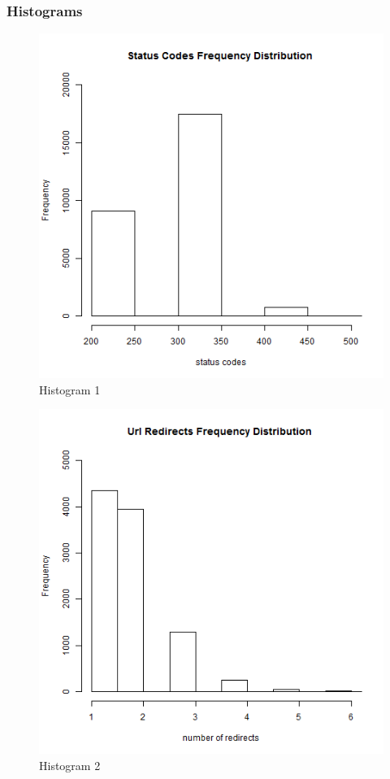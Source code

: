 \documentclass[12pt]{Report}
\begin{document}
\subsubsection{Histograms}
\begin{figure}[ht]    
    \begin{center}
        \includegraphics[scale=0.60]{StatusCodeHistogram.png}
        \caption{Histogram 1}
        \label{StatusCodes Frequency Distribution}
    \end{center}
\end{figure}
\newpage
\begin{figure}[ht]    
    \begin{center}
        \includegraphics[scale=0.60]{urlRedirectCount.png}
        \caption{Histogram 2}
        \label{Count of number of redirects}
    \end{center}
\end{figure}
\newpage
\end{document}
